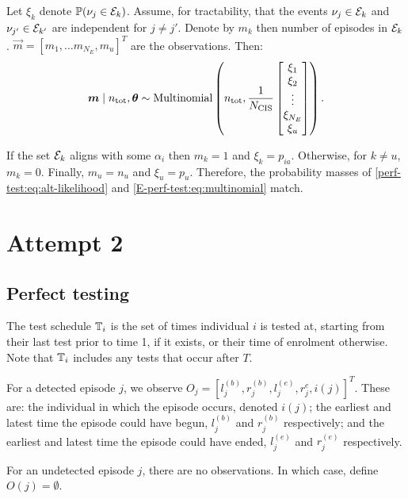 \documentclass[thesis.tex]{subfiles}
\begin{document}
Let $\xi_k$ denote $\operatorname{\mathbb{P}}(\nu_j \in \mathcal{E}_k)$.
Assume, for tractability, that the events $\nu_j \in \mathcal{E}_k$ and $\nu_{j'} \in \mathcal{E}_{k'}$ are independent for $j \neq j'$.
Denote by $m_k$ then number of episodes in $\mathcal{E}_k$.
$\vec{m} = [m_1, \dots m_{N_E}, m_u]^T$ are the observations.
Then:
\begin{align}
  \bm{m}
  \mid n_\text{tot}, \bm{\theta}
  \sim
  \operatorname{Multinomial}\left(
    n_\text{tot},
    \frac{1}{N_\text{CIS}}
    \begin{bmatrix}
        \xi_1 \\ \xi_2 \\ \vdots \\ \xi_{N_E} \\ \xi_u
    \end{bmatrix}
  \right).
  \label{perf-test:eq:alt-likelihood}
\end{align}

If the set $\mathcal{E}_k$ aligns with some $\alpha_i$ then $m_k = 1$ and $\xi_k = p_{ia}$.
Otherwise, for $k \neq u$, $m_k = 0$.
Finally, $m_u = n_u$ and $\xi_u = p_u$.
Therefore, the probability masses of \cref{perf-test:eq:alt-likelihood} and \cref{E-perf-test:eq:multinomial} match.



\section{Attempt 2}

\subsection{Perfect testing}

The test schedule $\mathbb{T}_i$ is the set of times individual $i$ is tested at, starting from their last test prior to time 1, if it exists, or their time of enrolment otherwise.
Note that $\mathbb{T}_i$ includes any tests that occur after $T$.

For a detected episode $j$, we observe $O_j = [l_j^{(b)}, r_j^{(b)}, l_j^{(e)}, r_j^{e}, i(j)]^T$.
These are: the individual in which the episode occurs, denoted $i(j)$; the earliest and latest time the episode could have begun, $l_j^{(b)}$ and $r_j^{(b)}$ respectively; and the earliest and latest time the episode could have ended, $l_j^{(e)}$ and $r_j^{(e)}$ respectively.

For an undetected episode $j$, there are no observations.
In which case, define $O(j) = \emptyset$.
\end{document}
